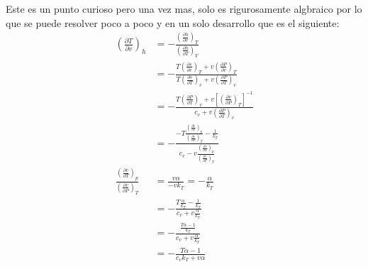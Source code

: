 \documentclass{report}
\begin{document}
Este es un punto curioso pero una vez mas, solo es rigurosamente algbraico por lo que se puede resolver poco a poco y en un solo desarrollo que es el siguiente:
\begin{align*}
  \left( \frac{\partial {T}}{\partial {v}} \right)_h &= - \frac{\left( \frac{\partial {h}}{\partial {v}} \right)_T}{\left( \frac{\partial {h}}{\partial {T}} \right)_V} \\
                                                     &= - \frac{T \left( \frac{\partial {s}}{\partial {v}} \right)_T + v \left( \frac{\partial {P}}{\partial {v}} \right)_T}{T \left( \frac{\partial {s}}{\partial {T}} \right)_v + v \left( \frac{\partial {P}}{\partial {T}}\right)_v} \\
                                                     &= - \frac{T \left( \frac{\partial {P}}{\partial {T}} \right)_v + v \left[ \left( \frac{\partial {v}}{\partial {P}} \right)_T \right]^{-1}}{c_v + v \left( \frac{\partial {P}}{\partial {T}} \right)_v} \\
                                                     &= - \frac{-T \frac{\left( \frac{\partial {v}}{\partial {T}} \right)_p}{\left( \frac{\partial {v}}{\partial {P}} \right)_T} - \frac{1}{k_T}  }{c_v - v \frac{\left( \frac{\partial {v}}{\partial {T}} \right)_p}{\left( \frac{\partial {v}}{\partial {P}} \right)_T}} \\
  \frac{\left( \frac{\partial {v}}{\partial {T}} \right)_p}{\left( \frac{\partial {v}}{\partial {P}} \right)_T} &= \frac{v\alpha}{-vk_T} = - \frac{\alpha}{k_T} \\
                                                     &= - \frac{T \frac{\alpha}{k_T} - \frac{1}{k_T} }{c_v+ v \frac{\alpha}{k_T} } \\
                                                     &= - \frac{\frac{T\alpha - 1}{k_T} }{c_v + v \frac{\alpha}{k_T} } \\
                                                     &= - \frac{T\alpha - 1}{c_vk_T + v\alpha} 
\end{align*}

\end{document}
